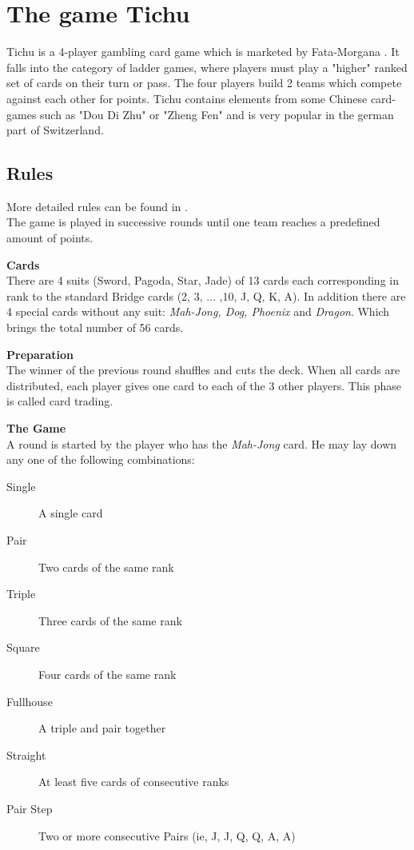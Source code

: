 \chapter{The game Tichu}
Tichu is a 4-player gambling card game which is marketed by Fata-Morgana \cite{fatamorgana}. It falls into the category of ladder games, where players must play a "higher" ranked set of cards on their turn or pass. The four players build 2 teams which compete against each other for points.
Tichu contains elements from some Chinese card-games such as "Dou Di Zhu" or "Zheng Fen" and is very popular in the german part of Switzerland.

\section{Rules}
More detailed rules can be found in \cite{fatamorgana, rules}.\\
The game is played in successive rounds until one team reaches a predefined amount of points.

\noindent\textbf{Cards} \\
There are 4 suits (Sword, Pagoda, Star, Jade) of 13 cards each corresponding in rank to the standard Bridge cards (2, 3, ... ,10, J, Q, K, A). In addition there are 4 special cards without any suit: \textit{Mah-Jong, Dog, Phoenix} and \textit{Dragon}. Which brings the total number of 56 cards.

\noindent\textbf{Preparation}\\
The winner of the previous round shuffles and cuts the deck. When all cards are distributed, each player gives one card to each of the 3 other players. This phase is called card trading.

\noindent\textbf{The Game}\\
A round is started by the player who has the \textit{Mah-Jong} card. He may lay down any one of the following combinations:
\begin{description}
    \item[Single] A single card
    \item[Pair] Two cards of the same rank
    \item[Triple] Three cards of the same rank
    \item[Square] Four cards of the same rank
    \item[Fullhouse] A triple and pair together
    \item[Straight] At least five cards of consecutive ranks
    \item[Pair Step] Two or more consecutive Pairs (ie, J, J, Q, Q, A, A)
\end{description}

